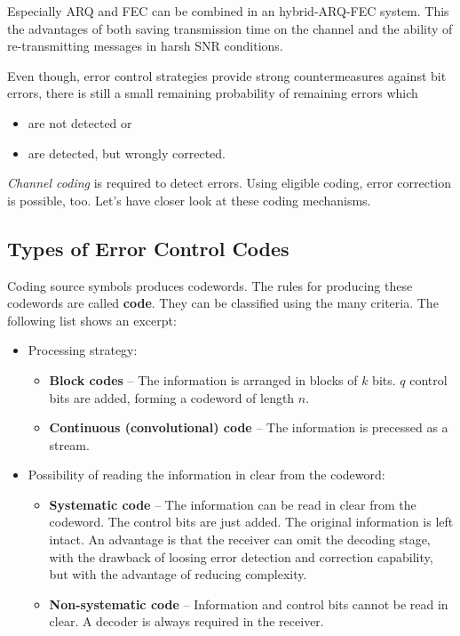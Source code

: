 \begin{refsection}
Especially \ac{ARQ} and \ac{FEC} can be combined in an hybrid-\acs{ARQ}-\acs{FEC} system. This the advantages of both saving transmission time on the channel and the ability of re-transmitting messages in harsh \ac{SNR} conditions.

Even though, error control strategies provide strong countermeasures against bit errors, there is still a small remaining probability of remaining errors which
\begin{itemize}
	\item are not detected or
	\item are detected, but wrongly corrected.
\end{itemize}

\emph{Channel coding} is required to detect errors. Using eligible coding, error correction is possible, too. Let's have closer look at these coding mechanisms.

\subsection{Types of Error Control Codes}

Coding source symbols produces codewords. The rules for producing these codewords are called  \textbf{code}. They can be classified using the many criteria. The following list shows an excerpt:

\begin{itemize}
	\item Processing strategy:
	\begin{itemize}
		\item {} \textbf{Block codes} -- The information is arranged in blocks of $k$ bits. $q$ control bits are added, forming a codeword of length $n$.
		\item {}  \textbf{Continuous (convolutional) code} -- The information is precessed as a stream.
	\end{itemize}
	\item Possibility of reading the information in clear from the codeword:
	\begin{itemize}
		\item {} \textbf{Systematic code} -- The information can be read in clear from the codeword. The control bits are just added. The original information is left intact. An advantage is that the receiver can omit the decoding stage, with the drawback of loosing error detection and correction capability, but with the advantage of reducing complexity.
		\item \textbf{Non-systematic code} -- Information and control bits cannot be read in clear. A decoder is always required in the receiver.
	\end{itemize}
\end{itemize}


\end{refsection}
